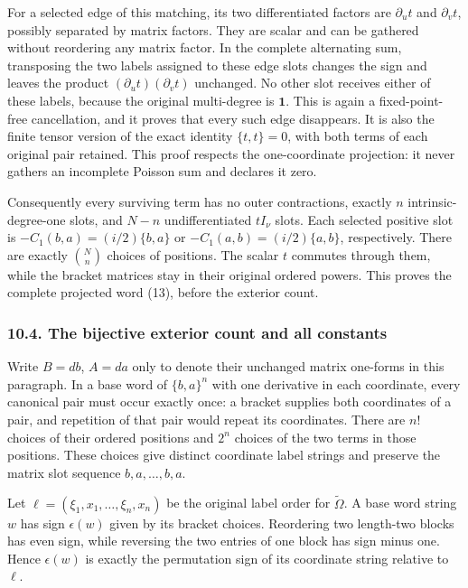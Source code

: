 \documentclass[
  11pt,
]{article}
\begin{document}
For a selected edge of this matching, its two differentiated factors are
\(\partial_ut\) and \(\partial_vt\), possibly separated by matrix
factors. They are scalar and can be gathered without reordering any
matrix factor. In the complete alternating sum, transposing the two
labels assigned to these edge slots changes the sign and leaves the
product \((\partial_ut)(\partial_vt)\) unchanged. No other slot receives
either of these labels, because the original multi-degree is
\(\mathbf1\). This is again a fixed-point-free cancellation, and it
proves that every such edge disappears. It is also the finite tensor
version of the exact identity \(\{t,t\}=0\), with both terms of each
original pair retained. This proof respects the one-coordinate
projection: it never gathers an incomplete Poisson sum and declares it
zero.

Consequently every surviving term has no outer contractions, exactly
\(n\) intrinsic-degree-one slots, and \(N-n\) undifferentiated
\(tI_\nu\) slots. Each selected positive slot is
\(-C_1(b,a)=(i/2)\{b,a\}\) or \(-C_1(a,b)=(i/2)\{a,b\}\), respectively.
There are exactly \(\binom Nn\) choices of positions. The scalar \(t\)
commutes through them, while the bracket matrices stay in their original
ordered powers. This proves the complete projected word (13), before the
exterior count.

\subsubsection{10.4. The bijective exterior count and all
constants}\label{the-bijective-exterior-count-and-all-constants}

Write \(B=db\), \(A=da\) only to denote their unchanged matrix one-forms
in this paragraph. In a base word of \(\{b,a\}^n\) with one derivative
in each coordinate, every canonical pair must occur exactly once: a
bracket supplies both coordinates of a pair, and repetition of that pair
would repeat its coordinates. There are \(n!\) choices of their ordered
positions and \(2^n\) choices of the two terms in those positions. These
choices give distinct coordinate label strings and preserve the matrix
slot sequence \(b,a,\ldots,b,a\).

Let \(\ell=(\xi_1,x_1,\ldots,\xi_n,x_n)\) be the original label order
for \(\widetilde\Omega\). A base word string \(w\) has sign
\(\epsilon(w)\) given by its bracket choices. Reordering two length-two
blocks has even sign, while reversing the two entries of one block has
sign minus one. Hence \(\epsilon(w)\) is exactly the permutation sign of
its coordinate string relative to \(\ell\).
\end{document}
